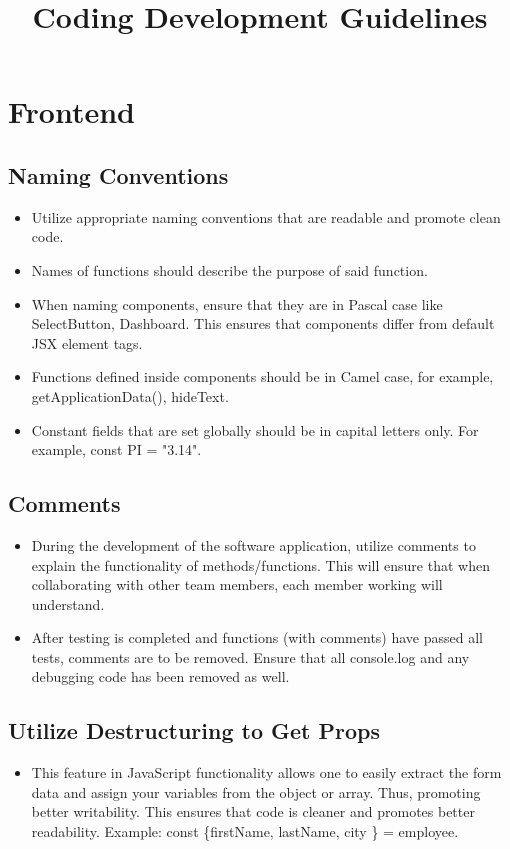 \documentclass{article}
\title{Coding Development Guidelines}
\author{}
\date{}
\begin{document}
\maketitle

\section{Frontend}
\subsection{Naming Conventions}
\begin{itemize}
    \item Utilize appropriate naming conventions that are readable and promote clean code.
    \item Names of functions should describe the purpose of said function.
    \item When naming components, ensure that they are in Pascal case like SelectButton, Dashboard. This ensures that components differ from default JSX element tags.
    \item Functions defined inside components should be in Camel case, for example, getApplicationData(), hideText.
    \item Constant fields that are set globally should be in capital letters only. For example, const PI = "3.14".
\end{itemize}

\subsection{Comments}
\begin{itemize}
    \item During the development of the software application, utilize comments to explain the functionality of methods/functions. This will ensure that when collaborating with other team members, each member working will understand.
    \item After testing is completed and functions (with comments) have passed all tests, comments are to be removed. Ensure that all console.log and any debugging code has been removed as well.
\end{itemize}

\subsection{Utilize Destructuring to Get Props}
\begin{itemize}
    \item This feature in JavaScript functionality allows one to easily extract the form data and assign your variables from the object or array. Thus, promoting better writability. This ensures that code is cleaner and promotes better readability. Example: const \{firstName, lastName, city \} = employee.
\end{itemize}
\end{document}
